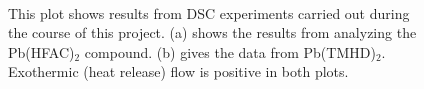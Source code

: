 \begin{figure}[htbp]
   \centering
    \\
   \caption[Results of DSC Experiments]%
   		{This plot shows results from DSC experiments carried out during the course of %
		this project. (a) shows the results from analyzing the Pb(HFAC)$_{2}$ compound. (b) gives %
		the data from Pb(TMHD)$_{2}$. Exothermic (heat release) flow is positive in both plots. }
   \label{fig:DSC-Data}
\end{figure}

\clearpage

